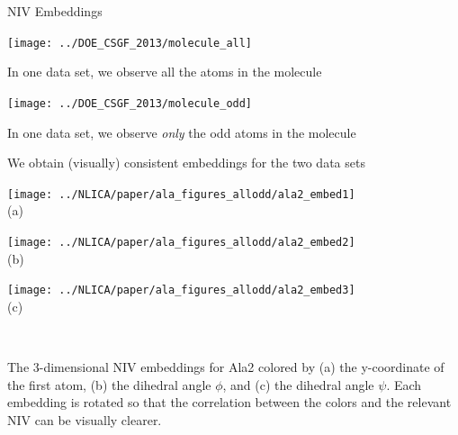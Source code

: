 \documentclass[12pt]{beamer}
\begin{document}
\begin{frame}{NIV Embeddings}
    \begin{minipage}[t]{0.45\textwidth}
        \centering
        \texttt{[image: ../DOE\_CSGF\_2013/molecule\_all]}\\
        {\small In one data set, we observe all the atoms in the molecule \par}
    \end{minipage}
    \hfill
    \begin{minipage}[t]{0.45\textwidth}
        \centering
        \texttt{[image: ../DOE\_CSGF\_2013/molecule\_odd]}\\
        {\small In one data set, we observe {\em only} the odd atoms in the molecule \par}
    \end{minipage}

    \vspace{0.2in}

    \centering
    We obtain (visually) consistent embeddings for the two data sets \\
    \begin{minipage}{0.2\textwidth}
        \centering
        \texttt{[image: ../NLICA/paper/ala\_figures\_allodd/ala2\_embed1]}\\
        (a)
    \end{minipage}
    \begin{minipage}{0.2\textwidth}
        \centering
        \texttt{[image: ../NLICA/paper/ala\_figures\_allodd/ala2\_embed2]}\\
        (b)
    \end{minipage}
    \begin{minipage}{0.2\textwidth}
        \centering
        \texttt{[image: ../NLICA/paper/ala\_figures\_allodd/ala2\_embed3]}\\
        (c)
    \end{minipage}\\
    {\small The 3-dimensional NIV embeddings for Ala2 colored by (a) the y-coordinate of the first atom, (b) the dihedral angle $\phi$, and (c) the dihedral angle $\psi$. Each embedding is rotated so that the correlation between the colors and the relevant NIV can be visually clearer. \par}

\end{frame}
\end{document}
